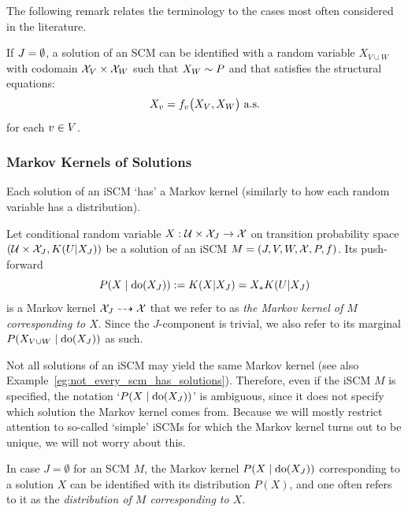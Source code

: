 The following remark relates the terminology to the cases most often considered in the literature.
\begin{Rem}\label{rem:scm_no_inputs_solutions}
  If $J = \emptyset$, a solution of an SCM can be identified with a random variable 
  $X_{V \cup W}$ with codomain $\mathcal{X}_{V} \times \mathcal{X}_{W}$ such that $X_{W} \sim P$ and that
  satisfies the structural equations:
  \begin{equation}\label{eq:scm_structural_equations_componentwise}
    X_v = f_v\big(X_{V}, X_{W}\big) \text{ a.s.}
  \end{equation}
  for each $v \in V$.
\end{Rem}

\subsubsection{Markov Kernels of Solutions}

Each solution of an iSCM `has' a Markov kernel (similarly to how each random variable has a distribution).
\begin{Not}\label{def:scm_kernels}
  Let conditional random variable $X : \mathcal{U} \times \mathcal{X}_{J} \to \mathcal{X}$ on transition probability space $(\mathcal{U} \times \mathcal{X}_{J}, K(U|X_{J}))$ be a solution of an iSCM
  $M = \left ( J, V, W, \mathcal{X}, P, f \right )$.
  Its push-forward 
  $$P(X \mid \operatorname{do}(X_J)) := K(X|X_{J}) = X_* K(U|X_J)$$
  is a Markov kernel $\mathcal{X}_{J} \dashrightarrow \mathcal{X}$ that we refer to as \emph{the Markov kernel of $M$ corresponding to $X$}.
  Since the $J$-component is trivial, we also refer to its marginal $P(X_{V\cup W}\mid \operatorname{do}(X_{J}))$ as such.
\end{Not}

Not all solutions of an iSCM may yield the same Markov kernel (see also Example~\ref{eg:not_every_scm_has_solutions}).
Therefore, even if the iSCM $M$ is specified, the notation `$P(X \mid \operatorname{do}(X_J))$' is ambiguous, since it does not specify which solution the Markov kernel comes from. 
Because we will mostly restrict attention to so-called `simple' iSCMs for which the Markov kernel turns out to be unique, we will not worry about this.

\begin{Rem}
In case $J = \emptyset$ for an SCM $M$, the Markov kernel $P(X \mid \operatorname{do}(X_J))$ corresponding to a solution $X$ can be identified with its distribution $P(X)$, and one often refers to it as the \emph{distribution of $M$ corresponding to $X$}.
\end{Rem}

